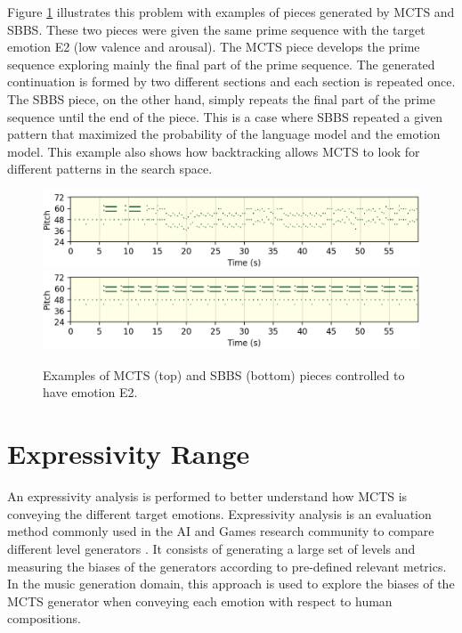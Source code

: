 Figure \ref{fig:ex_pieces} illustrates this problem with examples of pieces generated by MCTS and SBBS. These two pieces were given the same prime sequence with the target emotion E2 (low valence and arousal). The MCTS piece develops the prime sequence exploring mainly the final part of the prime sequence. The generated continuation is formed by two different sections and each section is repeated once. The SBBS piece, on the other hand, simply repeats the final part of the prime sequence until the end of the piece. This is a case where SBBS repeated a given pattern that maximized the probability of the language model and the emotion model. This example also shows how backtracking allows MCTS to look for different patterns in the search space.

\begin{figure}[h]
\centering
 \includegraphics[width=\columnwidth]{imgs/ismir21/mucts_piece_2_14.png}
 \includegraphics[width=\columnwidth]{imgs/ismir21/sbbs_piece_2_14.png}
 \caption{Examples of MCTS (top) and SBBS (bottom) pieces controlled to have emotion E2.}
 \label{fig:ex_pieces}
\end{figure}

\section{Expressivity Range}

An expressivity analysis is performed to better understand how MCTS is conveying the different target emotions. Expressivity analysis is an evaluation method commonly used in the AI and Games research community to compare different level generators \cite{smith2010analyzing}.  It consists of generating a large set of levels and measuring the biases of the generators according to pre-defined relevant metrics. In the music generation domain,  this approach is used to explore the biases of the MCTS generator when conveying each emotion with respect to human compositions.

